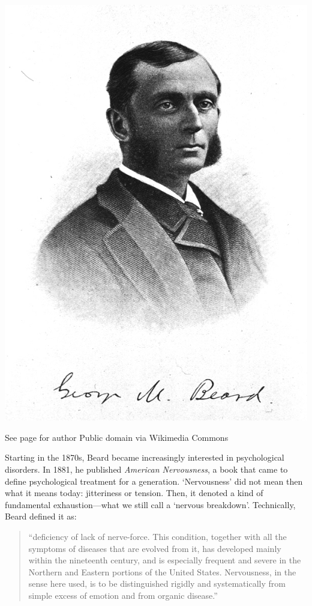 \begin{refsection}
\begin{marginfigure}
\begin{center}
     \includegraphics[scale=0.25]{../images/George_Miller_Beard.jpg}
\end{center}
 \caption{See page for author Public domain via Wikimedia Commons}
\label{fig: georgebeard}
\end{marginfigure}
 

Starting in the 1870s, Beard became increasingly interested in psychological disorders. In 1881, he published \emph{American Nervousness}, a book that came to define psychological treatment for a generation. `Nervousness' did not mean then what it means today: jitteriness or tension. Then, it denoted a kind of fundamental exhaustion—what we still call a `nervous breakdown'. Technically, Beard defined it as:

\begin{quote}

“deficiency of lack of nerve-force. This condition, together with all the symptoms of diseases that are evolved from it, has developed mainly within the nineteenth century, and is especially frequent and severe in the Northern and Eastern portions of the United States. Nervousness, in the sense here used, is to be distinguished rigidly and systematically from simple excess of emotion and from organic disease.” ~\citep[p. vi]{Beard:1881tg}
\end{quote}


\end{refsection}

